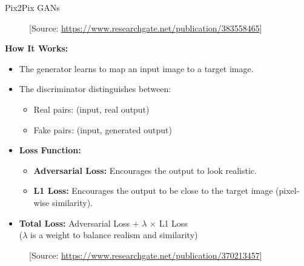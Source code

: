 \begin{frame}[allowframebreaks]{Pix2Pix GANs}
    \begin{figure}
        \centering
        \caption*{\scriptsize [Source: \url{https://www.researchgate.net/publication/383558465}]}
    \end{figure}

    \textbf{How It Works:}
    \begin{itemize}
        \item The generator learns to map an input image to a target image.
        \item The discriminator distinguishes between:
        \begin{itemize}
            \item Real pairs: (input, real output)
            \item Fake pairs: (input, generated output)
        \end{itemize}
        \item \textbf{Loss Function:}
        \begin{itemize}
            \item \textbf{Adversarial Loss:} Encourages the output to look realistic.
            \item \textbf{L1 Loss:} Encourages the output to be close to the target image (pixel-wise similarity).
        \end{itemize}
        \item \textbf{Total Loss:} Adversarial Loss $+$ $\lambda$ $\times$ L1 Loss \\
        ($\lambda$ is a weight to balance realism and similarity)
    \end{itemize}
\framebreak
    \begin{figure}
        \centering
        \caption*{\scriptsize [Source: \url{https://www.researchgate.net/publication/370213457}]}
    \end{figure}
\end{frame}

